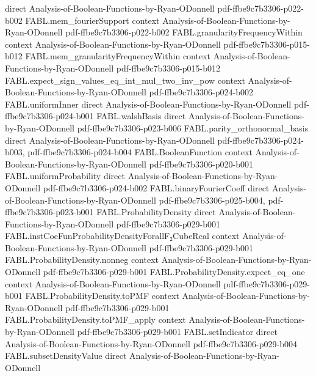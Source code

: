 \begin{theorem}
  {direct}
  {Analysis-of-Boolean-Functions-by-Ryan-ODonnell}
  {pdf-ffbe9c7b3306-p022-b002}
\proofstep
  {FABL.mem_fourierSupport}
  {context}
  {Analysis-of-Boolean-Functions-by-Ryan-ODonnell}
  {pdf-ffbe9c7b3306-p022-b002}
\proofstep
  {FABL.granularityFrequencyWithin}
  {context}
  {Analysis-of-Boolean-Functions-by-Ryan-ODonnell}
  {pdf-ffbe9c7b3306-p015-b012}
\proofstep
  {FABL.mem_granularityFrequencyWithin}
  {context}
  {Analysis-of-Boolean-Functions-by-Ryan-ODonnell}
  {pdf-ffbe9c7b3306-p015-b012}
\proofstep
  {FABL.expect_sign_values_eq_int_mul_two_inv_pow}
  {context}
  {Analysis-of-Boolean-Functions-by-Ryan-ODonnell}
  {pdf-ffbe9c7b3306-p024-b002}
\proofstep
  {FABL.uniformInner}
  {direct}
  {Analysis-of-Boolean-Functions-by-Ryan-ODonnell}
  {pdf-ffbe9c7b3306-p024-b001}
\proofstep
  {FABL.walshBasis}
  {direct}
  {Analysis-of-Boolean-Functions-by-Ryan-ODonnell}
  {pdf-ffbe9c7b3306-p023-b006}
\proofstep
  {FABL.parity_orthonormal_basis}
  {direct}
  {Analysis-of-Boolean-Functions-by-Ryan-ODonnell}
  {pdf-ffbe9c7b3306-p024-b003,
    pdf-ffbe9c7b3306-p024-b004}
\proofstep
  {FABL.BooleanFunction}
  {context}
  {Analysis-of-Boolean-Functions-by-Ryan-ODonnell}
  {pdf-ffbe9c7b3306-p020-b001}
\proofstep
  {FABL.uniformProbability}
  {direct}
  {Analysis-of-Boolean-Functions-by-Ryan-ODonnell}
  {pdf-ffbe9c7b3306-p024-b002}
\proofstep
  {FABL.binaryFourierCoeff}
  {direct}
  {Analysis-of-Boolean-Functions-by-Ryan-ODonnell}
  {pdf-ffbe9c7b3306-p025-b004,
    pdf-ffbe9c7b3306-p023-b001}
\proofstep
  {FABL.ProbabilityDensity}
  {direct}
  {Analysis-of-Boolean-Functions-by-Ryan-ODonnell}
  {pdf-ffbe9c7b3306-p029-b001}
\proofstep
  {FABL.instCoeFunProbabilityDensityForallF₂CubeReal}
  {context}
  {Analysis-of-Boolean-Functions-by-Ryan-ODonnell}
  {pdf-ffbe9c7b3306-p029-b001}
\proofstep
  {FABL.ProbabilityDensity.nonneg}
  {context}
  {Analysis-of-Boolean-Functions-by-Ryan-ODonnell}
  {pdf-ffbe9c7b3306-p029-b001}
\proofstep
  {FABL.ProbabilityDensity.expect_eq_one}
  {context}
  {Analysis-of-Boolean-Functions-by-Ryan-ODonnell}
  {pdf-ffbe9c7b3306-p029-b001}
\proofstep
  {FABL.ProbabilityDensity.toPMF}
  {context}
  {Analysis-of-Boolean-Functions-by-Ryan-ODonnell}
  {pdf-ffbe9c7b3306-p029-b001}
\proofstep
  {FABL.ProbabilityDensity.toPMF_apply}
  {context}
  {Analysis-of-Boolean-Functions-by-Ryan-ODonnell}
  {pdf-ffbe9c7b3306-p029-b001}
\proofstep
  {FABL.setIndicator}
  {direct}
  {Analysis-of-Boolean-Functions-by-Ryan-ODonnell}
  {pdf-ffbe9c7b3306-p029-b004}
\proofstep
  {FABL.subsetDensityValue}
  {direct}
  {Analysis-of-Boolean-Functions-by-Ryan-ODonnell}

\end{theorem}
